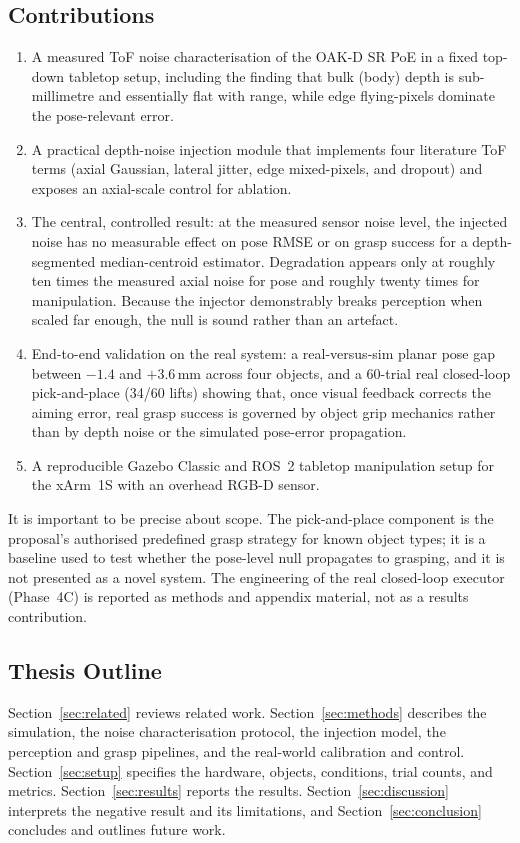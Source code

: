 \subsection{Contributions}
\begin{enumerate}
  \item A measured ToF noise characterisation of the OAK-D SR PoE in a fixed top-down
  tabletop setup, including the finding that bulk (body) depth is sub-millimetre and
  essentially flat with range, while edge flying-pixels dominate the pose-relevant error.
  \item A practical depth-noise injection module that implements four literature ToF
  terms (axial Gaussian, lateral jitter, edge mixed-pixels, and dropout) and exposes an
  axial-scale control for ablation.
  \item The central, controlled result: at the measured sensor noise level, the injected
  noise has no measurable effect on pose RMSE or on grasp success for a depth-segmented
  median-centroid estimator. Degradation appears only at roughly ten times the measured
  axial noise for pose and roughly twenty times for manipulation. Because the injector
  demonstrably breaks perception when scaled far enough, the null is sound rather than an
  artefact.
  \item End-to-end validation on the real system: a real-versus-sim planar pose gap
  between $-1.4$ and $+3.6$\,mm across four objects, and a 60-trial real closed-loop
  pick-and-place (34/60 lifts) showing that, once visual feedback corrects the aiming
  error, real grasp success is governed by object grip mechanics rather than by depth
  noise or the simulated pose-error propagation.
  \item A reproducible Gazebo Classic and ROS~2 tabletop manipulation setup for the
  xArm~1S with an overhead RGB-D sensor.
\end{enumerate}
It is important to be precise about scope. The pick-and-place component is the proposal's
authorised predefined grasp strategy for known object types; it is a baseline used to
test whether the pose-level null propagates to grasping, and it is not presented as a
novel system. The engineering of the real closed-loop executor (Phase~4C) is reported as
methods and appendix material, not as a results contribution.

\subsection{Thesis Outline}
Section~\ref{sec:related} reviews related work. Section~\ref{sec:methods} describes the
simulation, the noise characterisation protocol, the injection model, the perception and
grasp pipelines, and the real-world calibration and control. Section~\ref{sec:setup}
specifies the hardware, objects, conditions, trial counts, and metrics.
Section~\ref{sec:results} reports the results. Section~\ref{sec:discussion} interprets the
negative result and its limitations, and Section~\ref{sec:conclusion} concludes and
outlines future work.

